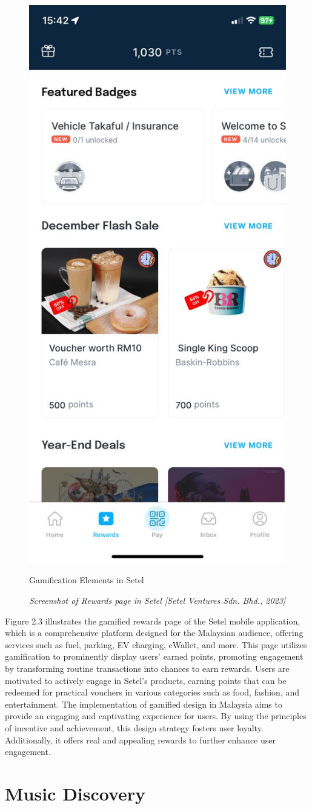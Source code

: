\begin{figure}[h]
    \centering
    \includegraphics[width=0.35\linewidth]{mainmatter/images/gami1.jpg}
    \caption{Gamification Elements in Setel}
    \caption*{\textit{Screenshot of Rewards page in Setel [Setel Ventures Sdn. Bhd., 2023]}}
    \label{fig:myfig5}
\end{figure}
Figure 2.3 illustrates the gamified rewards page of the Setel mobile application, which is a comprehensive platform designed for the Malaysian audience, offering services such as fuel, parking, EV charging, eWallet, and more. This page utilizes gamification to prominently display users' earned points, promoting engagement by transforming routine transactions into chances to earn rewards. Users are motivated to actively engage in Setel's products, earning points that can be redeemed for practical vouchers in various categories such as food, fashion, and entertainment. The implementation of gamified design in Malaysia aims to provide an engaging and captivating experience for users. By using the principles of incentive and achievement, this design strategy fosters user loyalty. Additionally, it offers real and appealing rewards to further enhance user engagement.

\section{Music Discovery}

